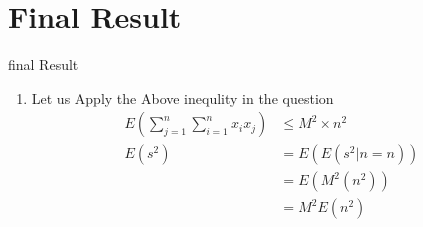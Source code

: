 \documentclass{beamer}
\providecommand{\e}[1]{\ensuremath{E\left(#1\right)}}
\providecommand{\brak}[1]{\ensuremath{\left(#1\right)}}
\newcounter{saveenumi}
\newcommand{\seti}{\setcounter{saveenumi}{\value{enumi}}}
\begin{document}
\section{Final Result}
\begin{frame}{final Result}

\begin{enumerate}
\seti
\item Let us Apply the Above inequlity in the question
	\begin{align}
\e{\sum_{j=1}^{n} \sum_{i=1}^{n} x_i x_j} &\le M^2 \times n^{2} \\
					\e{s^2}&=\e{\e{s^2|n=n}}\\ &=\e{M^2\brak{n^2}} \\
				       				       &=M^2\e{n^2}
		\end{align}
		\end{enumerate}
\end{frame}
\end{document}
